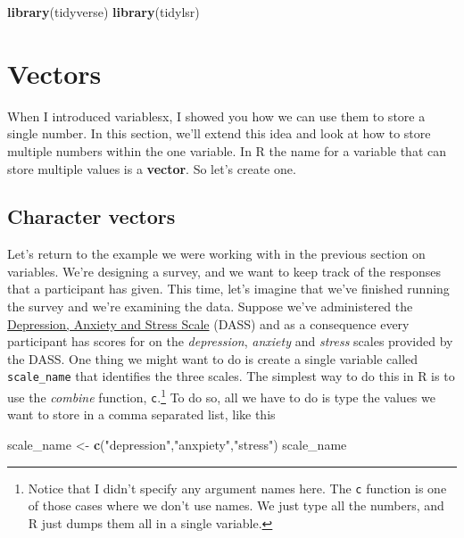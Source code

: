 \documentclass[]{book}
\newenvironment{Shaded}{\begin{snugshade}}{\end{snugshade}}
\newcommand{\KeywordTok}[1]{\textcolor[rgb]{0.13,0.29,0.53}{\textbf{#1}}}
\newcommand{\NormalTok}[1]{#1}
\newcommand{\StringTok}[1]{\textcolor[rgb]{0.31,0.60,0.02}{#1}}
\let\rmarkdownfootnote\footnote%
\def\footnote{\protect\rmarkdownfootnote}
\begin{document}
\begin{Shaded}
\begin{Highlighting}[]
\KeywordTok{library}\NormalTok{(tidyverse)}
\KeywordTok{library}\NormalTok{(tidylsr)}
\end{Highlighting}
\end{Shaded}

\hypertarget{vectors}{%
\section{Vectors}\label{vectors}}

When I introduced variablesx, I showed you how we can use them to store a single number. In this section, we'll extend this idea and look at how to store multiple numbers within the one variable. In R the name for a variable that can store multiple values is a \textbf{vector}. So let's create one.

\hypertarget{character-vectors}{%
\subsection{Character vectors}\label{character-vectors}}

Let's return to the example we were working with in the previous section on variables. We're designing a survey, and we want to keep track of the responses that a participant has given. This time, let's imagine that we've finished running the survey and we're examining the data. Suppose we've administered the \href{http://www2.psy.unsw.edu.au/dass/}{Depression, Anxiety and Stress Scale} (DASS) and as a consequence every participant has scores for on the \emph{depression}, \emph{anxiety} and \emph{stress} scales provided by the DASS. One thing we might want to do is create a single variable called \texttt{scale\_name} that identifies the three scales. The simplest way to do this in R is to use the \emph{combine} function, \texttt{c}.\footnote{Notice that I didn't specify any argument names here. The \texttt{c} function is one of those cases where we don't use names. We just type all the numbers, and R just dumps them all in a single variable.} To do so, all we have to do is type the values we want to store in a comma separated list, like this

\begin{Shaded}
\begin{Highlighting}[]
\NormalTok{scale_name <-}\StringTok{ }\KeywordTok{c}\NormalTok{(}\StringTok{"depression"}\NormalTok{,}\StringTok{"anxpiety"}\NormalTok{,}\StringTok{"stress"}\NormalTok{)}
\NormalTok{scale_name}
\end{Highlighting}
\end{Shaded}
\end{document}
